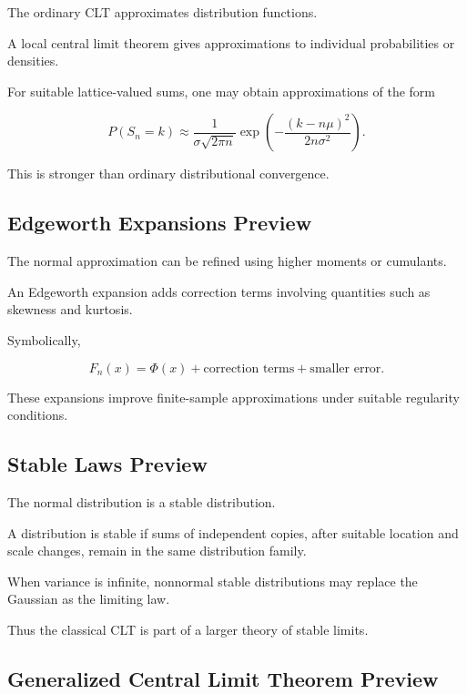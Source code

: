 The ordinary CLT approximates distribution functions.

A local central limit theorem gives approximations to individual
probabilities or densities.

For suitable lattice-valued sums, one may obtain approximations of the
form

\[
\boxed{
P(S_n=k)
\approx
\frac{
1
}{
\sigma\sqrt{2\pi n}
}
\exp
\left(
-
\frac{
(k-n\mu)^2
}{
2n\sigma^2
}
\right).
}
\]

This is stronger than ordinary distributional convergence.

\subsection{Edgeworth Expansions Preview}
\label{subsec:edgeworth-expansions-preview}

The normal approximation can be refined using higher moments or
cumulants.

An Edgeworth expansion adds correction terms involving quantities such
as skewness and kurtosis.

Symbolically,

\[
\boxed{
F_n(x)
=
\Phi(x)
+
\text{correction terms}
+
\text{smaller error}.
}
\]

These expansions improve finite-sample approximations under suitable
regularity conditions.

\subsection{Stable Laws Preview}
\label{subsec:stable-laws-clt-preview}

The normal distribution is a stable distribution.

A distribution is stable if sums of independent copies, after suitable
location and scale changes, remain in the same distribution family.

When variance is infinite, nonnormal stable distributions may replace
the Gaussian as the limiting law.

Thus the classical CLT is part of a larger theory of stable limits.

\subsection{Generalized Central Limit Theorem Preview}
\label{subsec:generalized-clt-preview}

